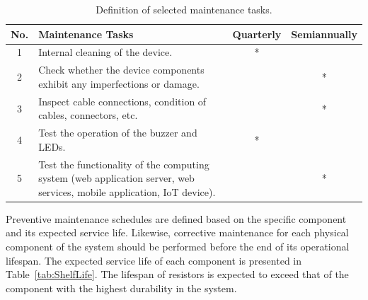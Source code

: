                 
                \begin{table}[!htbp]
                    \centering
                    \caption{Definition of selected maintenance tasks.}
                    \label{tab:maintenance-tasks}
                    \begin{tabularx}{\textwidth}{cXcc}
                        \toprule
                        \textbf{No.} & \textbf{Maintenance Tasks} & \textbf{Quarterly} & \textbf{Semiannually} \\
                        \midrule
                        1 & Internal cleaning of the device. & * & \\
                        2 & Check whether the device components exhibit any imperfections or damage. & & * \\
                        3 & Inspect cable connections, condition of cables, connectors, etc. & & * \\
                        4 & Test the operation of the buzzer and LEDs. & * & \\
                        5 & Test the functionality of the computing system (web application server, web services, mobile application, IoT device). & & * \\
                        \bottomrule
                    \end{tabularx}
                \end{table}
                
                Preventive maintenance schedules are defined based on the specific component and its expected service life. Likewise, corrective maintenance for each physical component of the system should be performed before the end of its operational lifespan. The expected service life of each component is presented in Table~\ref{tab:ShelfLife}. The lifespan of resistors is expected to exceed that of the component with the highest durability in the system.
                
